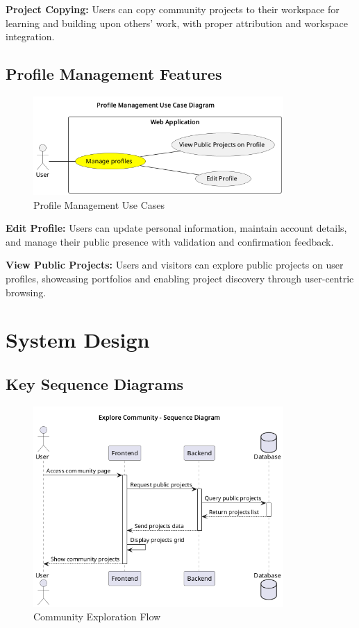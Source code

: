 \textbf{Project Copying:} Users can copy community projects to their workspace for learning and building upon others' work, with proper attribution and workspace integration.

\subsection{Profile Management Features}

\begin{figure}[H]
\centering
\includegraphics[width=0.85\textwidth]{conception/SprintV/use_case_diagrams/refined_use_case_feature_profiles .png}
\caption{Profile Management Use Cases}
\label{fig:profile_management_use_case}
\end{figure}

\textbf{Edit Profile:} Users can update personal information, maintain account details, and manage their public presence with validation and confirmation feedback.

\textbf{View Public Projects:} Users and visitors can explore public projects on user profiles, showcasing portfolios and enabling project discovery through user-centric browsing.

\section{System Design}

\subsection{Key Sequence Diagrams}

\begin{figure}[H]
\centering
\includegraphics[width=0.85\textwidth]{conception/SprintV/sequence_diagrams/sequence_communityInteraction_6_1_ExploreCommunityAsUser.png}
\caption{Community Exploration Flow}
\label{fig:seq_explore_community}
\end{figure}

